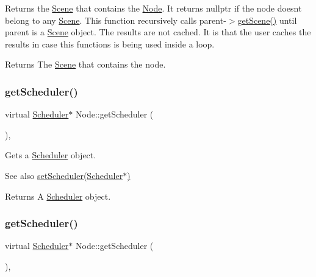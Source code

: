 Returns the \hyperlink{classScene}{Scene} that contains the \hyperlink{classNode}{Node}. It returns {\ttfamily nullptr} if the node doesn\textquotesingle{}t belong to any \hyperlink{classScene}{Scene}. This function recursively calls parent-\/$>$\hyperlink{classNode_a5a61a356773de436f80e55228ea01b66}{get\+Scene()} until parent is a \hyperlink{classScene}{Scene} object. The results are not cached. It is that the user caches the results in case this functions is being used inside a loop.

\begin{DoxyReturn}{Returns}
The \hyperlink{classScene}{Scene} that contains the node. 
\end{DoxyReturn}
\mbox{\label{classNode_a5d438ab0f04dfa3af9a72ae608478264}} 
\subsubsection{\texorpdfstring{get\+Scheduler()}{getScheduler()}\hspace{0.1cm}{\footnotesize\ttfamily [1/2]}}
{\footnotesize\ttfamily virtual \hyperlink{classScheduler}{Scheduler}$\ast$ Node\+::get\+Scheduler (\begin{DoxyParamCaption}{ }\end{DoxyParamCaption})\hspace{0.3cm}{\ttfamily [inline]}, {\ttfamily [virtual]}}

Gets a \hyperlink{classScheduler}{Scheduler} object.

\begin{DoxySeeAlso}{See also}
\hyperlink{classNode_a9f0c84dfabdce76b5251725944ae7706}{set\+Scheduler(\+Scheduler$\ast$)} 
\end{DoxySeeAlso}
\begin{DoxyReturn}{Returns}
A \hyperlink{classScheduler}{Scheduler} object. 
\end{DoxyReturn}
\mbox{\label{classNode_a5d438ab0f04dfa3af9a72ae608478264}} 
\subsubsection{\texorpdfstring{get\+Scheduler()}{getScheduler()}\hspace{0.1cm}{\footnotesize\ttfamily [2/2]}}
{\footnotesize\ttfamily virtual \hyperlink{classScheduler}{Scheduler}$\ast$ Node\+::get\+Scheduler (\begin{DoxyParamCaption}{ }\end{DoxyParamCaption})\hspace{0.3cm}{\ttfamily [inline]}, {\ttfamily [virtual]}}

